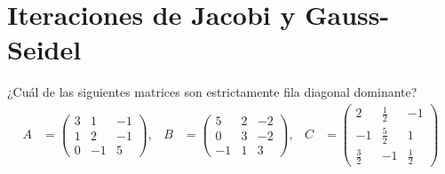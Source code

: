\documentclass[12pt]{book}
\begin{document}
\section{Iteraciones de Jacobi y Gauss-Seidel}
\eje ¿Cuál de las siguientes matrices son estrictamente fila diagonal dominante?
\begin{align*}
    A&=\begin{pmatrix}
    3 & 1 & -1\\
    1 & 2 & -1\\
    0 & -1 & 5
    \end{pmatrix} , & B&=\begin{pmatrix}
    5 & 2 & -2\\
    0 & 3 & -2\\
   -1 & 1 & 3
   \end{pmatrix}, & C&=\begin{pmatrix}
   2 & \frac{1}{2} & -1\\
  -1 & \frac{5}{2} & 1\\
  \frac{3}{2} & -1 & \frac{1}{2}
  \end{pmatrix}
\end{align*}
\end{document}
